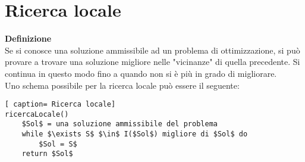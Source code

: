 \documentclass[../cheatSheetAlgoritmi.tex]{subfiles}
\begin{document}
\chapter{Ricerca locale}
\textbf{Definizione}\\
Se si conosce una soluzione ammissibile ad un problema di ottimizzazione, si può provare a trovare una soluzione migliore nelle "vicinanze" di quella precedente. Si continua in questo modo fino a quando non si è più in grado di migliorare. \\
Uno schema possibile per la ricerca locale può essere il seguente:
\begin{lstlisting}[ caption= Ricerca locale]
ricercaLocale()
	$Sol$ = una soluzione ammissibile del problema
	while $\exists S$ $\in$ I($Sol$) migliore di $Sol$ do
		$Sol = S$
	return $Sol$
\end{lstlisting}
\end{document}
